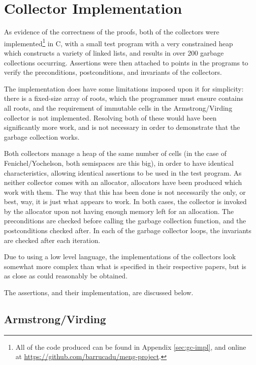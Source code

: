 \section{Collector Implementation}
\label{sec:results-impl}

As evidence of the correctness of the proofs, both of the collectors
were implemented\footnote{All of the code produced can be found in
  Appendix \ref{sec:gc-impl}, and online at
  \url{https://github.com/barrucadu/meng-project}.} in C, with a small
test program with a very constrained heap which constructs a variety
of linked lists, and results in over 200 garbage collections
occurring. Assertions were then attached to points in the programs to
verify the preconditions, postconditions, and invariants of the
collectors.

The implementation does have some limitations imposed upon it for
simplicity: there is a fixed-size array of roots, which the programmer
must ensure contains all roots, and the requirement of immutable cells
in the Armstrong/Virding collector is not implemented. Resolving both
of these would have been significantly more work, and is not necessary
in order to demonstrate that the garbage collection works.

Both collectors manage a heap of the same number of cells (in the case
of Fenichel/Yochelson, both semispaces are this big), in order to have
identical characteristics, allowing identical assertions to be used in
the test program. As neither collector comes with an allocator,
allocators have been produced which work with them. The way that this
has been done is not necessarily the only, or best, way, it is just
what appears to work. In both cases, the collector is invoked by the
allocator upon not having enough memory left for an allocation. The
preconditions are checked before calling the garbage collection
function, and the postconditions checked after. In each of the garbage
collector loops, the invariants are checked after each iteration.

Due to using a low level language, the implementations of the
collectors look somewhat more complex than what is specified in their
respective papers, but is as close as could reasonably be obtained.

The assertions, and their implementation, are discussed below.

\subsection{Armstrong/Virding}
\label{sec:results-impl-ms}

